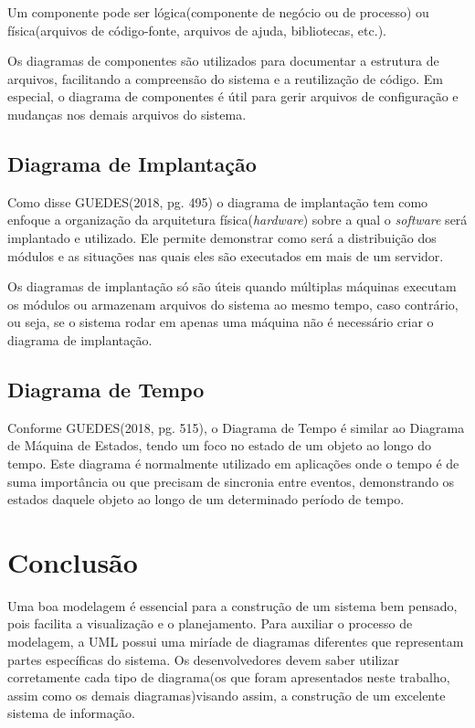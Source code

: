 \documentclass[12pt,openright,oneside,a4paper,
	chapter=TITLE,
	section=TITLE,
	english,brazil]{abntex2}
\begin{document}
Um componente pode ser lógica(componente de negócio ou de processo) ou física(arquivos de código-fonte, arquivos de ajuda, bibliotecas, etc.).

Os diagramas de componentes são utilizados para documentar a estrutura de arquivos, facilitando a compreensão do sistema e a reutilização de código. Em especial, o diagrama de componentes é útil para gerir arquivos de configuração e mudanças nos demais arquivos do sistema.

\section{Diagrama de Implantação}

Como disse GUEDES(2018, pg. 495) o diagrama de implantação tem como enfoque a organização da arquitetura física(\textit{hardware}) sobre a qual o \textit{software} será implantado e utilizado. Ele permite demonstrar como será a distribuição dos módulos e as situações nas quais eles são executados em mais de um servidor.

Os diagramas de implantação só são úteis quando múltiplas máquinas executam os módulos ou armazenam arquivos do sistema ao mesmo tempo, caso contrário, ou seja, se o sistema rodar em apenas uma máquina não é necessário criar o diagrama de implantação.

\section{Diagrama de Tempo}

Conforme GUEDES(2018, pg. 515), o Diagrama de Tempo é similar ao Diagrama de Máquina de Estados, tendo um foco no estado de um objeto ao longo do tempo. Este diagrama é normalmente utilizado em aplicações onde o tempo é de suma importância ou que precisam de sincronia entre eventos, demonstrando os estados daquele objeto ao longo de um determinado período de tempo.

\chapter{Conclusão}

Uma boa modelagem é essencial para a construção de um sistema bem pensado, pois facilita a visualização e o planejamento. Para auxiliar o processo de modelagem, a UML possui uma miríade de diagramas diferentes que representam partes específicas do sistema. Os desenvolvedores devem saber utilizar corretamente cada tipo de diagrama(os que foram apresentados neste trabalho, assim como os demais diagramas)visando assim, a construção de um excelente sistema de informação. 

\postextual


\nocite{GUEDES}
\nocite{BEZERRA}
\nocite{LARMAN}
\nocite{UML}
\end{document}

